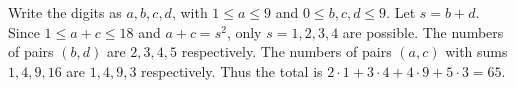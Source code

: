 Write the digits as $a,b,c,d$, with $1\le a\le 9$ and $0\le b,c,d\le 9$. Let $s=b+d$. Since $1\le a+c\le 18$ and $a+c=s^2$, only $s=1,2,3,4$ are possible. The numbers of pairs $(b,d)$ are $2,3,4,5$ respectively. The numbers of pairs $(a,c)$ with sums $1,4,9,16$ are $1,4,9,3$ respectively. Thus the total is $2\cdot 1+3\cdot 4+4\cdot 9+5\cdot 3=\boxed{65}$.
